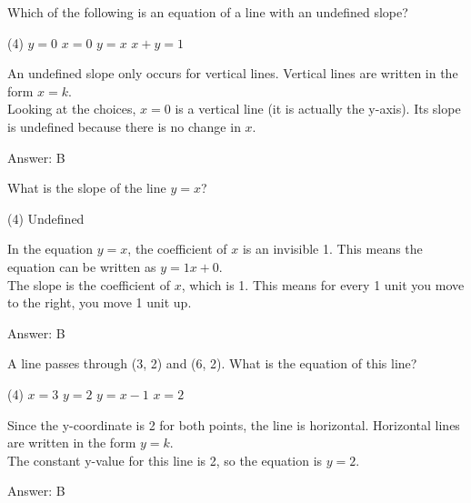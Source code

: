 \documentclass[11pt,paper=a4,answers]{exam}
\begin{document}
\begin{questions}
\question
Which of the following is an equation of a line with an undefined slope?
\begin{tasks}(4)
    \task $y = 0$
    \task $x = 0$
    \task $y = x$
    \task $x + y = 1$
\end{tasks}

\begin{solution}
An undefined slope only occurs for vertical lines. Vertical lines are written in the form $x = k$.
\\[10pt]
Looking at the choices, $x = 0$ is a vertical line (it is actually the y-axis). Its slope is undefined because there is no change in $x$.

\vspace{15pt}
Answer: \colorbox{yellow!100}{B}
\end{solution}

\question
What is the slope of the line $y = x$?
\begin{tasks}(4)
    \task Undefined
\end{tasks}

\begin{solution}
In the equation $y = x$, the coefficient of $x$ is an invisible 1. This means the equation can be written as $y = 1x + 0$.
\\[10pt]
The slope is the coefficient of $x$, which is 1. This means for every 1 unit you move to the right, you move 1 unit up.

\vspace{15pt}
Answer: \colorbox{yellow!100}{B}
\end{solution}

\question
A line passes through (3, 2) and (6, 2). What is the equation of this line?
\begin{tasks}(4)
    \task $x = 3$
    \task $y = 2$
    \task $y = x - 1$
    \task $x = 2$
\end{tasks}

\begin{solution}
Since the y-coordinate is 2 for both points, the line is horizontal. Horizontal lines are written in the form $y = k$.
\\[10pt]
The constant y-value for this line is 2, so the equation is $y = 2$.

\vspace{15pt}
Answer: \colorbox{yellow!100}{B}
\end{solution}


\end{questions}
\end{document}
